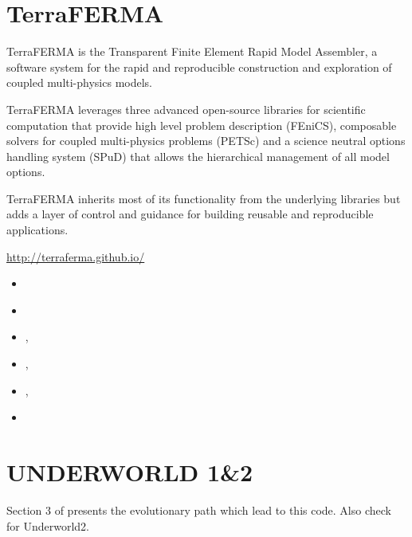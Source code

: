 \section{TerraFERMA} 
TerraFERMA is the Transparent Finite Element Rapid Model Assembler, a software 
system for the rapid and reproducible construction and exploration of coupled multi-physics models.

TerraFERMA leverages three advanced open-source libraries for scientific computation that 
provide high level problem description (FEniCS), composable solvers for coupled multi-physics 
problems (PETSc) and a science neutral options handling system (SPuD) that allows the hierarchical 
management of all model options.

TerraFERMA inherits most of its functionality from the underlying libraries but adds a layer of 
control and guidance for building reusable and reproducible applications.

\url{http://terraferma.github.io/}

\begin{small}
\begin{itemize}
\item[\twothousandfourteen]  \textcite{wisv14}
\item[\twothousandsixteen]   \textcite{spmw16}
\item[\twothousandseventeen] \textcite{wisv17}, \textcite{ceww17}
\item[\twothousandnineteen]  \textcite{ceww19}, \textcite{perr19}
\item[\twothousandtwenty]    \textcite{siss20}, \textcite{abvw20}
\item[\twothousandtwentytwo] \textcite{ceap22}
\end{itemize}
\end{small}



\section{UNDERWORLD 1\&2} 
Section 3 of \cite{qums07} presents the evolutionary path which lead to this code.
Also check \cite{magm20} for Underworld2. 

